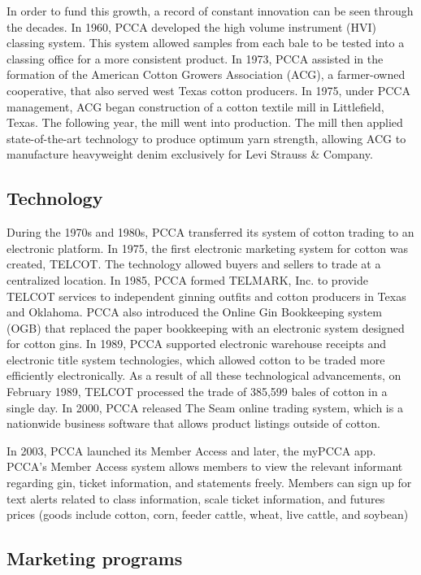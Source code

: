 \documentclass[a4paper]{article}
\begin{document}
In order to fund this growth, a record of constant innovation can be seen through the decades. In 1960, PCCA developed the high volume instrument (HVI) classing system. This system allowed samples from each bale to be tested into a classing office for a more consistent product. In 1973, PCCA assisted in the formation of the American Cotton Growers Association (ACG), a farmer-owned cooperative, that also served west Texas cotton producers. In 1975, under PCCA management, ACG began construction of a cotton textile mill in Littlefield, Texas. The following year, the mill went into production. The mill then applied state-of-the-art technology to produce optimum yarn strength, allowing ACG to manufacture heavyweight denim exclusively for Levi Strauss \& Company. 

\subsection{Technology}

During the 1970s and 1980s, PCCA transferred its system of cotton trading to an electronic platform. In 1975, the first electronic marketing system for cotton was created, TELCOT. The technology allowed buyers and sellers to trade at a centralized location. In 1985, PCCA formed TELMARK, Inc. to provide TELCOT services to independent ginning outfits and cotton producers in Texas and Oklahoma. PCCA also introduced the Online Gin Bookkeeping system (OGB) that replaced the paper bookkeeping with an electronic system designed for cotton gins. In 1989, PCCA supported electronic warehouse receipts and electronic title system technologies, which allowed cotton to be traded more efficiently electronically. As a result of all these technological advancements, on February 1989, TELCOT processed the trade of 385,599 bales of cotton in a single day. In 2000, PCCA released The Seam online trading system, which is a nationwide business software that allows product listings outside of cotton.

In 2003, PCCA launched its Member Access and later, the myPCCA app. PCCA's Member Access system allows members to view the relevant informant regarding gin, ticket information, and statements freely. Members can sign up for text alerts related to class information, scale ticket information, and futures prices (goods include cotton, corn, feeder cattle, wheat, live cattle, and soybean) 

\subsection{Marketing programs}
\end{document}
